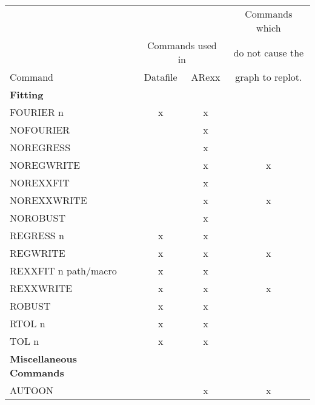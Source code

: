 \begin{table}[h]
\begin{center}
\scriptsize
\begin{tabular}{lccc} \hline
                                 &           &        & Commands which     \\
                                 & \multicolumn{2}{c}{Commands used in} %
                                                      & do not cause the   \\ \cline{2-3}
Command                          & Datafile  & ARexx  & graph to replot.   \\ \hline
{\bf Fitting}                    &           &        &                    \\
FOURIER  n                       &     x     &     x  &                    \\
NOFOURIER                        &           &     x  &                    \\
NOREGRESS                        &           &     x  &                    \\
NOREGWRITE                       &           &     x  &       x            \\
NOREXXFIT                        &           &     x  &                    \\
NOREXXWRITE                      &           &     x  &       x            \\
NOROBUST                         &           &     x  &                    \\
REGRESS  n                       &     x     &     x  &                    \\
REGWRITE                         &     x     &     x  &       x            \\
REXXFIT  n   path/macro          &     x     &     x  &                    \\
REXXWRITE                        &     x     &     x  &       x            \\
ROBUST                           &     x     &     x  &                    \\
RTOL  n                          &     x     &     x  &                    \\
TOL  n                           &     x     &     x  &                    \\ \hline
{\bf Miscellaneous Commands}     &           &        &                    \\
AUTOON                           &           &     x  &       x            \\

\end{tabular}
\end{center}
\end{table}
